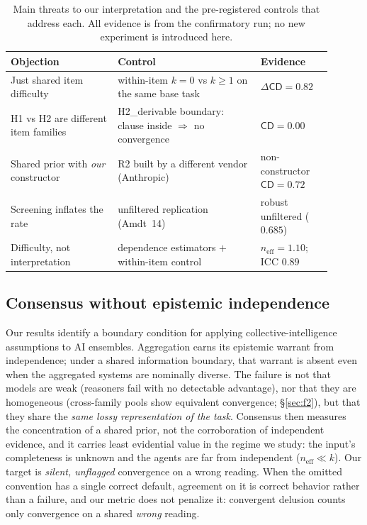 \documentclass[acmsmall,screen,review,anonymous]{acmart}
\newcommand{\cd}{\textsf{CD}}
\newcommand{\neff}{\ensuremath{n_{\mathrm{eff}}}}
\begin{document}
\begin{table}[t]
\centering\small
\caption{Main threats to our interpretation and the pre-registered controls that address each. All evidence
is from the confirmatory run; no new experiment is introduced here.}
\label{tab:threats}
\begin{tabular}{@{}p{0.30\linewidth}p{0.40\linewidth}p{0.20\linewidth}@{}}
\toprule
Objection & Control & Evidence \\
\midrule
Just shared item difficulty & within-item $k{=}0$ vs $k{\ge}1$ on the same base task & $\Delta\cd=0.82$ \\
H1 vs H2 are different item families & H2\_derivable boundary: clause inside $\Rightarrow$ no convergence & $\cd=0.00$ \\
Shared prior with \emph{our} constructor & R2 built by a different vendor (Anthropic) & non-constructor $\cd=0.72$ \\
Screening inflates the rate & unfiltered replication (Amdt~14) & robust unfiltered ($0.685$) \\
Difficulty, not interpretation & dependence estimators $+$ within-item control & $\neff{=}1.10$; ICC $0.89$ \\
\bottomrule
\end{tabular}
\end{table}

\subsection{Consensus without epistemic independence}
Our results identify a boundary condition for applying collective-intelligence assumptions to AI ensembles.
Aggregation earns its epistemic warrant from independence; under a shared information boundary, that warrant
is absent even when the aggregated systems are nominally diverse. The failure is not that models are weak
(reasoners fail with no detectable advantage), nor that they are homogeneous (cross-family pools show
equivalent convergence; \S\ref{sec:f2}), but that
they share the \emph{same lossy representation of the task}. Consensus then measures the concentration of a
shared prior, not the corroboration of independent evidence, and it carries least evidential value in the
regime we study: the input's completeness is unknown and the agents are far from independent
($\neff\!\ll\!k$).
Our target is \emph{silent, unflagged} convergence on a wrong reading. When the omitted convention has a
single correct default, agreement on it is correct behavior rather than a failure, and our metric does not
penalize it: convergent delusion counts only convergence on a shared \emph{wrong} reading.
\end{document}
